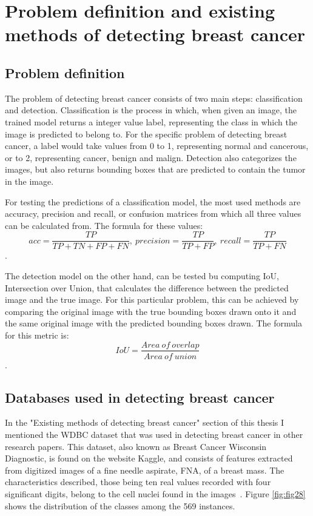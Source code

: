\chapter{Problem definition and existing methods of detecting breast cancer}
\label{chap:ch2}

\section{Problem definition}
The problem of detecting breast cancer consists of two main steps: classification and detection. Classification is the process in which, when given an image, the trained model returns a integer value label, representing the class in which the image is predicted to belong to. For the specific problem of detecting breast cancer, a label would take values from 0 to 1, representing normal and cancerous, or to 2, representing cancer, benign and malign. Detection also categorizes the images, but also returns bounding boxes that are predicted to contain the tumor in the image. 

For testing the predictions of a classification model, the most used methods are accuracy, precision and recall, or confusion matrices from which all three values can be calculated from. The formula for these values: \[acc = \frac{TP}{TP + TN + FP + FN},\ precision = \frac{TP}{TP + FP},\ recall = \frac{TP}{TP + FN}\].

The detection model on the other hand, can be tested bu computing IoU, Intersection over Union, that calculates the difference between the predicted image and the true image. For this particular problem, this can be achieved by comparing the original image with the true bounding boxes drawn onto it and the same original image with the predicted bounding boxes drawn. The formula for this metric is: \[IoU = \frac{Area\ of\ overlap}{Area\ of\ union}\].

\section{Databases used in detecting breast cancer}

In the "Existing methods of detecting breast cancer" section of this thesis
I mentioned the WDBC dataset that was used in detecting breast cancer in other research papers. This dataset, also known as Breast Cancer Wisconsin Diagnostic, is found on the website Kaggle, and consists of features extracted from digitized images of a fine needle aspirate, FNA, of a breast mass. The characteristics described, those being ten real values recorded with four significant digits, belong to the cell nuclei found in the images~\cite{link9}. 
Figure \ref{fig:fig28} shows the distribution of the classes among the 569 instances.

